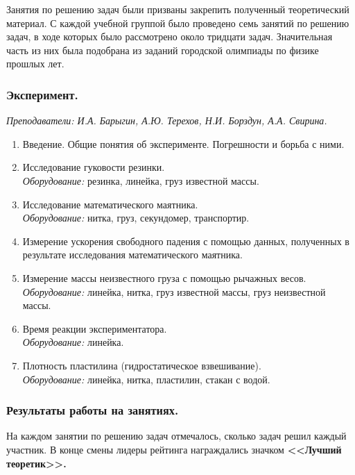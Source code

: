\documentclass[12pt]{article}
\newlength{\h}
\newlength{\x}
\begin{document}
Занятия по решению задач были призваны закрепить полученный
теоретический материал. С каждой учебной группой было проведено семь
занятий по решению задач, в ходе которых было рассмотрено около
тридцати задач. Значительная часть из них была подобрана из заданий
городской олимпиады по физике прошлых лет. 

\subsubsection{Эксперимент.}
\label{sec:daily8exp}

\textit{Преподаватели: И.А. Барыгин, А.Ю. Терехов, Н.И. Борздун, А.А. Свирина.}\\

\begin{enumerate}
\item Введение. Общие понятия об эксперименте. Погрешности и борьба с
  ними.
\item Исследование гуковости резинки. \\
  \textit{Оборудование:} резинка, линейка, груз известной массы.
\item Исследование математического маятника. \\
  \textit{Оборудование:} нитка, груз, секундомер, транспортир.
\item Измерение ускорения свободного падения с помощью данных,
  полученных в результате исследования математического маятника.
\item Измерение массы неизвестного груза с помощью рычажных весов. \\
  \textit{Оборудование:} линейка, нитка, груз известной массы,
  груз неизвестной массы. 
\item Время реакции экспериментатора. \\
  \textit{Оборудование:} линейка.
\item Плотность пластилина (гидростатическое взвешивание). \\
  \textit{Оборудование:} линейка, нитка, пластилин, стакан с водой. 
\end{enumerate}

\subsubsection{Результаты работы на занятиях. }
\label{sec:daily8res}

На каждом занятии по решению задач отмечалось, сколько задач решил
каждый участник. В конце смены лидеры рейтинга награждались значком
\textbf{<<Лучший теоретик>>.}
\end{document}

